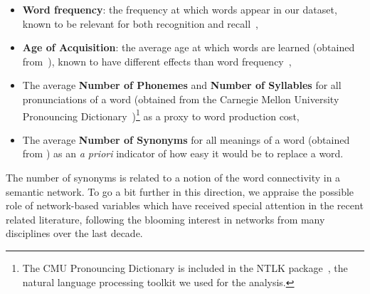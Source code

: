 \begin{itemize}
    \item \textbf{Word frequency}: the frequency at which words appear in our dataset, known to be relevant for both recognition and recall~\citep{gregg1976word},
    \item \textbf{Age of Acquisition}: the average age at which words are learned (obtained from~\citet{Kuperman12}), known to have different effects than word frequency~\citep{morrison1995roles,dewhurst1998separate},
    \item The average \textbf{Number of Phonemes} and \textbf{Number of Syllables} for all pronunciations of a word (obtained from the Carnegie Mellon University Pronouncing Dictionary~\citep{Weide98})\footnote{The CMU Pronouncing Dictionary is included in the NTLK package~\citep{Bird09}, the natural language processing toolkit we used for the analysis.} as a proxy to word production cost,
    \item The average \textbf{Number of Synonyms} for all meanings of a word (obtained from \citet{WordNet10}) as an \emph{a priori} indicator of how easy it would be to replace a word.
\end{itemize}


The number of synonyms is related to a notion of the word connectivity in a semantic network.  To go a bit further in this direction, we appraise the possible role of network-based variables which have received special attention in the recent related literature, following the blooming interest in networks from many disciplines over the last decade. 

